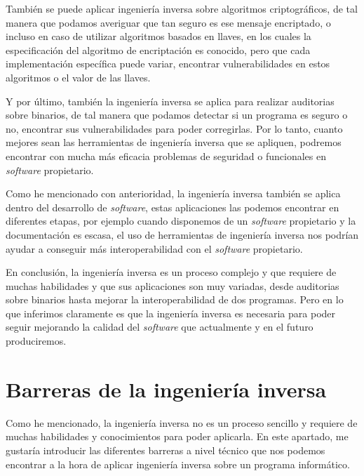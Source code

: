 También se puede aplicar ingeniería inversa sobre algoritmos criptográficos, de tal manera
que podamos averiguar que tan seguro es ese mensaje encriptado, o incluso en caso de utilizar
algoritmos basados en llaves, en los cuales la especificación del algoritmo de encriptación
es conocido, pero que cada implementación específica puede variar, encontrar vulnerabilidades
en estos algoritmos o el valor de las llaves.

Y por último, también la ingeniería inversa se aplica para realizar auditorias sobre binarios,
de tal manera que podamos detectar si un programa es seguro o no, encontrar sus vulnerabilidades
para poder corregirlas. Por lo tanto, cuanto mejores sean las herramientas de ingeniería inversa
que se apliquen, podremos encontrar con mucha más eficacia problemas de seguridad o funcionales
en \textit{software} propietario.

Como he mencionado con anterioridad, la ingeniería inversa también se aplica dentro del desarrollo
de \textit{software}, estas aplicaciones las podemos encontrar en diferentes etapas, por ejemplo
cuando disponemos de un \textit{software} propietario y la documentación es escasa, el uso de
herramientas de ingeniería inversa nos podrían ayudar a conseguir más interoperabilidad con
el \textit{software} propietario.

En conclusión, la ingeniería inversa es un proceso complejo y que requiere de muchas habilidades
y que sus aplicaciones son muy variadas, desde auditorias sobre binarios hasta mejorar
la interoperabilidad de dos programas. Pero en lo que inferimos claramente es que la
ingeniería inversa es necesaria para poder seguir mejorando la calidad del \textit{software}
que actualmente y en el futuro produciremos.

\section{Barreras de la ingeniería inversa}
\label{sec:barreras}


Como he mencionado, la ingeniería inversa no es un proceso sencillo y requiere de muchas
habilidades y conocimientos para poder aplicarla. En este apartado, me gustaría introducir
las diferentes barreras a nivel técnico que nos podemos encontrar a la hora de aplicar
ingeniería inversa sobre un programa informático. \cite{alma991004951313206711}

